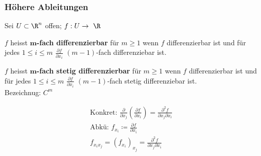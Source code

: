 \subsubsection{Höhere Ableitungen}
Sei $U \subset \R^n$ offen; $f: U \rightarrow \R$ \\
\begin{def*}[note = $m$-fach differenzierbar , index = $m$-fach differenzierbar , indexformat = {2!1~}]
	$f$ heisst \textbf{$\mathbf{m}$-fach differenzierbar} für $m \geq 1$ wenn $f$ differenzierbar ist und für jedes $1 \leq i \leq m$ $\frac{\partial f}{\partial x_i}$ $(m-1)$-fach differenziebar ist.
\end{def*}
\begin{def*}[note = $m$-fach stetig differenzierbar , index = $m$-fach stetig differenzierbar , indexformat = {3!2~!1~ 2!~3!1~}]
	$f$ heisst \textbf{$\mathbf{m}$-fach stetig differenzierbar} für $m \geq 1$ wenn $f$ differenzierbar ist und für jedes $1 \leq i \leq m$ $\frac{\partial f}{\partial x_i}$ $(m-1)$-fach stetig differenziebar ist. \\
	Bezeichnug: $C^m$
\end{def*}
\begin{gather*}
	\text{Konkret: } \frac{\partial}{\partial x_j} \left( \frac{\partial f}{\partial x_i} \right) = \frac{\partial^2 f}{\partial x_j \partial x_i} \\
	\text{Abkü: } f_{x_i} \coloneqq \frac{\partial f}{\partial x_i} \\
	f_{x_i x_j} = (f_{x_i})_{x_j} = \frac{\partial^2 f}{\partial x_j \partial x_i}
\end{gather*}
